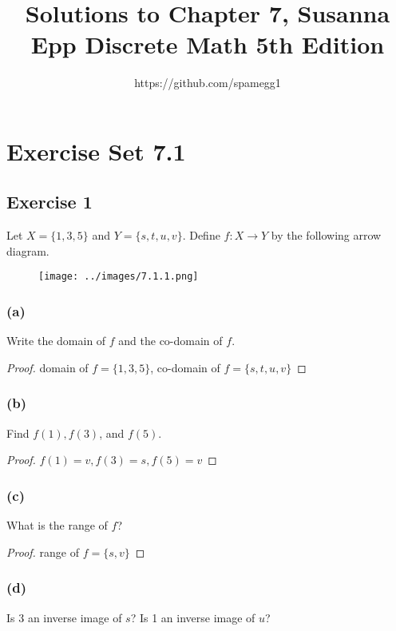 \documentclass[14pt]{extarticle}
\title{Solutions to Chapter 7, Susanna Epp Discrete Math 5th Edition}
\author{https://github.com/spamegg1}
\begin{document}
\maketitle
\tableofcontents

\section{Exercise Set 7.1}

\subsection{Exercise 1}
Let \(X = \{1, 3, 5\}\) and \(Y = \{s, t, u, v\}\). Define \(f: X \to Y\) by the following arrow diagram.

\begin{figure}[ht!]
    \centering
    \texttt{[image: ../images/7.1.1.png]}
\end{figure}

\subsubsection{(a)}
Write the domain of $f$ and the co-domain of $f$.

\begin{proof}
    domain of \(f = \{1, 3, 5\}\), co-domain of \(f = \{s, t, u, v\}\)
\end{proof}

\subsubsection{(b)}
Find $f(1), f(3)$, and $f(5)$.

\begin{proof}
    \(f(1) = v, f(3) = s, f(5) = v\)
\end{proof}

\subsubsection{(c)}
What is the range of $f$?

\begin{proof}
    range of \(f = \{s, v\}\)
\end{proof}

\subsubsection{(d)}
Is 3 an inverse image of $s$? Is 1 an inverse image of $u$?
\end{document}
